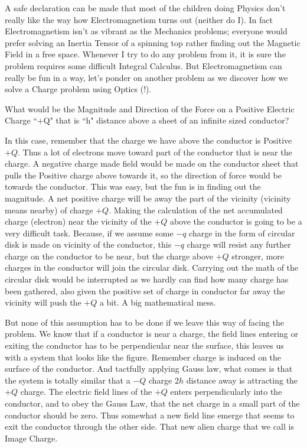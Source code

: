 \documentclass[11pt,a4paper]{article}
\begin{document}
 
	A safe declaration can be made that most of the children doing Physics don't really like the way how Electromagnetism turns out (neither do I). In fact Electromagnetism isn't as vibrant as the Mechanics problems; everyone would prefer solving an Inertia Tensor of a spinning top rather finding out the Magnetic Field in a free space. Whenever I try to do any problem from it, it is sure the problem requires some difficult Integral Calculus. But Electromagnetism can really be fun in a way, let's ponder on another problem as we discover how we solve a Charge problem using Optics (!).
	
	
	What would be the Magnitude and Direction of the Force on a Positive Electric Charge ``+Q" that is ``h" distance above a sheet of an infinite sized conductor? 

	
In this case, remember that the charge we have above the conductor is Positive 
$+Q$. Thus a lot of electrons move toward part of the conductor that is near the charge. A negative charge made field would be made on the conductor sheet that pulls the Positive charge above towards it, so the direction of force would be towards the conductor. This was easy, but the fun is in finding out the magnitude. A net positive charge will be away the part of the vicinity (vicinity means nearby) of charge $+Q$. Making the calculation of the net accumulated charge (electron) near the vicinity of the $+Q$ above the conductor is going to be a very difficult task. Because, if we assume some $-q$ charge in the form of circular disk is made on vicinity of the conductor, this $-q$ charge will resist any further charge on the conductor to be near, but the charge above $+Q$ stronger, more charges in the conductor will join the circular disk. Carrying out the math of the circular disk would be interrupted as we hardly can find how many charge has been gathered, also given the positive set of charge in conductor far away the vicinity will push the $+Q$ a bit. A big mathematical mess.


But none of this assumption has to be done if we leave this way of facing the problem.  We know that if a conductor is near a charge, the field lines entering or exiting the conductor has to be perpendicular near the surface, this leaves us with a system that looks like the figure. Remember charge is induced on the surface of the conductor. And tactfully applying Gauss law, what comes is that the system is totally similar that a $-Q$ charge $2h$ distance away is attracting the $+Q$ charge. The electric field lines of the $+Q$ enters perpendicularly into the conductor, and to obey the Gauss Law, that the net charge in a small part of the conductor should be zero. Thus somewhat a new field line emerge that seems to exit the conductor through the other side. That new alien charge that we call is Image Charge. 
	
\end{document}
